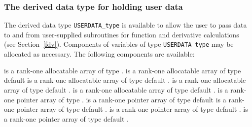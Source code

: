 \subsubsection{The derived data type for holding user data}\label{typeuserdata}
The derived data type {\tt USERDATA\_type} is available 
to allow the user to pass data to and from user-supplied
subroutines for function and derivative calculations (see Section~\ref{fdv}).
Components of variables of type {\tt USERDATA\_type} may be 
allocated as necessary. The following components are available:

\begin{description}
 is a rank-one allocatable array of type \integer.
 is a rank-one allocatable array of type default  \realdp
{} is a rank-one allocatable array of type default \complexdp.
 is a rank-one allocatable array of type default \character.
 is a rank-one allocatable array of type default \logical.
 is a rank-one pointer array of type \integer.
 is a rank-one pointer array of type default  \realdp
{} is a rank-one pointer array of type default \complexdp.
 is a rank-one pointer array of type default \character.
 is a rank-one pointer array of type default \logical.
\end{description}
